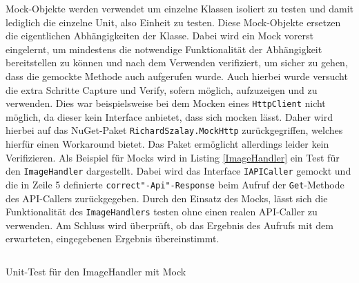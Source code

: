 \noindent Mock-Objekte werden verwendet um einzelne Klassen isoliert zu testen und damit lediglich die einzelne Unit, also Einheit zu testen. Diese Mock-Objekte ersetzen die eigentlichen Abhängigkeiten der Klasse. Dabei wird ein Mock vorerst eingelernt, um mindestens die notwendige Funktionalität der Abhängigkeit bereitstellen zu können und nach dem Verwenden verifiziert, um sicher zu gehen, dass die gemockte Methode auch aufgerufen wurde. Auch hierbei wurde versucht die extra Schritte Capture und Verify, sofern möglich, aufzuzeigen und zu verwenden. Dies war beispielsweise bei dem Mocken eines \texttt{HttpClient} nicht möglich, da dieser kein Interface anbietet, dass sich mocken lässt. Daher wird hierbei auf das NuGet-Paket \texttt{RichardSzalay.MockHttp} zurückgegriffen, welches hierfür einen Workaround bietet. Das Paket ermöglicht allerdings leider kein Verifizieren. Als Beispiel für Mocks wird in Listing \ref{ImageHandler} ein Test für den \texttt{ImageHandler} dargestellt. Dabei wird das Interface \texttt{IAPICaller} gemockt und die in Zeile 5 definierte \texttt{correct"-Api"-Response} beim Aufruf der \texttt{Get}-Methode des API-Callers zurückgegeben. Durch den Einsatz des Mocks, lässt sich die Funktionalität des \texttt{ImageHandlers} testen ohne einen realen API-Caller zu verwenden. Am Schluss wird überprüft, ob das Ergebnis des Aufrufs mit dem erwarteten, eingegebenen Ergebnis übereinstimmt.

\begin{listing}[h]
\inputminted[linenos, breaklines, tabsize=2, breakbytokenanywhere]{csharp}{Listings/ImageHandlerTest.cs}
\caption{Unit-Test für den ImageHandler mit Mock}
\label{ImageHandler}
\end{listing}

